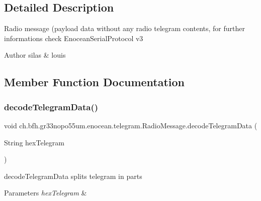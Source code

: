 \subsection{Detailed Description}
Radio message (payload data without any radio telegram contents, for further informations check Enocean\+Serial\+Protocol v3

\begin{DoxyAuthor}{Author}
silas \& louis 
\end{DoxyAuthor}


\subsection{Member Function Documentation}
\hypertarget{classch_1_1bfh_1_1gr33nopo55um_1_1enocean_1_1telegram_1_1_radio_message_a452e81a42c7eae0906b27881e3034b83}{}\label{classch_1_1bfh_1_1gr33nopo55um_1_1enocean_1_1telegram_1_1_radio_message_a452e81a42c7eae0906b27881e3034b83} 
\subsubsection{\texorpdfstring{decode\+Telegram\+Data()}{decodeTelegramData()}}
{\footnotesize\ttfamily void ch.\+bfh.\+gr33nopo55um.\+enocean.\+telegram.\+Radio\+Message.\+decode\+Telegram\+Data (\begin{DoxyParamCaption}\item[{String}]{hex\+Telegram }\end{DoxyParamCaption})}

decode\+Telegram\+Data splits telegram in parts


\begin{DoxyParams}{Parameters}
{\em hex\+Telegram} & \\
\hline
\end{DoxyParams}
\hypertarget{classch_1_1bfh_1_1gr33nopo55um_1_1enocean_1_1telegram_1_1_radio_message_aaddde18bd4e2f9243346bb3482fb5643}{}\label{classch_1_1bfh_1_1gr33nopo55um_1_1enocean_1_1telegram_1_1_radio_message_aaddde18bd4e2f9243346bb3482fb5643} 
